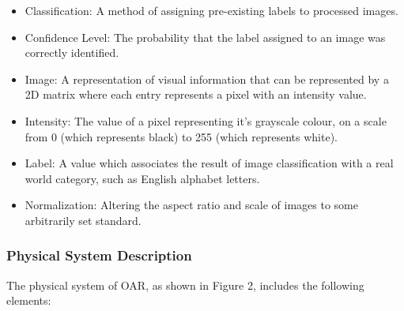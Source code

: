 \documentclass[12pt]{article}
\begin{document}
\begin{itemize}

\item Classification: A method of assigning pre-existing labels to processed images.
\item Confidence Level: The probability that the label assigned to an image was correctly identified.
\item Image: A representation of visual information that can be represented by a 2D matrix where each entry represents a pixel with an intensity value.
\item Intensity: The value of a pixel representing it's grayscale colour, on a scale from 0 (which represents black) to 255 (which represents white).
\item Label: A value which associates the result of image classification with a real world category, such as English alphabet letters.
\item Normalization: Altering the aspect ratio and scale of images to some arbitrarily set standard.


\end{itemize}

\subsubsection{Physical System Description} \label{sec_phySystDescrip}

The physical system of OAR, as shown in Figure 2,
includes the following elements:
\end{document}
